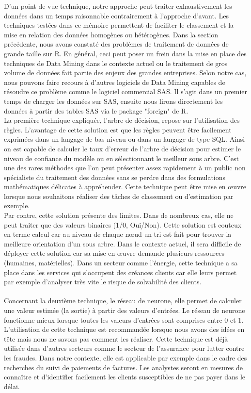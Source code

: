 \documentclass[11pt,a4paper]{report}
\begin{document}
D'un point de vue technique, notre approche peut traiter exhaustivement les données dans un temps raisonnable contrairement à l'approche d'avant. Les techniques testées dans ce mémoire permettent de faciliter le classement et la mise en relation des données homogènes ou hétérogènes. Dans la section précédente, nous avons constaté des problèmes de traitement de données de grande taille sur R. En général, ceci peut poser un frein dans la mise en place des techniques de Data Mining dans le contexte actuel ou le traitement de gros volume de données fait partie des enjeux des grandes entreprises. Selon notre cas, nous pouvons faire recours à d'autres logiciels de Data Mining capables de résoudre ce problème comme le logiciel commercial SAS. Il s'agit dans un premier temps de charger les données sur SAS, ensuite nous lirons directement les données à partir des tables SAS via le package "foreign" de R.   \\
La première technique expliquée, l'arbre de décision, repose sur l'utilisation des règles. L'avantage de cette solution est que les règles peuvent être facilement exprimées dans un langage de bas niveau ou dans un langage de type SQL. Ainsi on est capable de calculer le taux d'erreur de l'arbre de décision pour estimer le niveau de confiance du modèle ou en sélectionnant le meilleur sous arbre. C’est une des rares méthodes que l’on peut présenter assez rapidement à un public non spécialiste du traitement des données sans se perdre dans des formulations mathématiques délicates à appréhender. Cette technique peut être mise en œuvre lorsque nous souhaitons réaliser des tâches de classement ou d'estimation par exemple. \\
Par contre, cette solution présente des limites. Dans de nombreux cas, elle ne peut traiter que des valeurs binaires (1/0, Oui/Non). Cette solution est couteux en terme calcul car au niveau de chaque nœud un tri est fait pour trouver la meilleure orientation d'un sous arbre. Dans le contexte actuel, il sera difficile de déployer cette solution car sa mise en œuvre demande plusieurs ressources (humaines, matérielles). Dans un secteur comme l'énergie, cette technique a sa place dans les services qui s'occupent des créances clients car elle leurs permet par exemple d'analyser très vite le risque de solvabilité des clients.\\\\
Concernant la deuxième technique, le réseau de neurone, elle permet de calculer une valeur estimée (la sortie) à partir des valeurs d'entrées. Le réseau de neurone fonctionne mieux lorsque toutes les valeurs d'entrées sont comprises entre 0 et 1. L'utilisation de cette technique est recommandée lorsque nous avons des idées en tête mais nous ne savons pas comment les réaliser. Cette technique est déjà utilisée dans d'autres secteurs comme le secteur de l'assurance pour lutter contre les fraudes. Dans notre contexte, elle est applicable par exemple dans le cadre des recherches du suivi de paiements de factures. Les analystes seront en mesures de connaître et d'identifier facilement les clients susceptibles de ne pas payer dans le délai. \\
\end{document}
